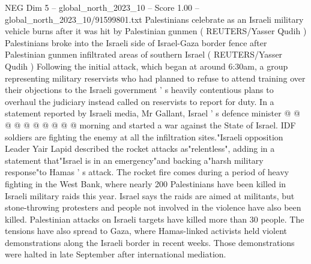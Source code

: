 \begin{textsample}{NEG Dim 5 – global\_north\_2023\_10 – Score 1.00 – global\_north\_2023\_10/91599801.txt}
Palestinians celebrate as an Israeli military vehicle burns after it was hit by Palestinian gunmen ( REUTERS/Yasser Qudih ) Palestinians broke into the Israeli side of Israel-Gaza border fence after Palestinian gunmen infiltrated areas of southern Israel ( REUTERS/Yasser Qudih ) Following the initial attack, which began at around 6:30am, a group representing military reservists who had planned to refuse to attend training over their objections to the Israeli government ' s heavily contentious plans to overhaul the judiciary instead called on reservists to report for duty.
In a statement reported by Israeli media, Mr Gallant, Israel ' s defence minister @ @ @ @ @ @ @ @ @ @ morning and started a war against the State of Israel.
IDF soldiers are fighting the enemy at all the infiltration sites."Israeli opposition Leader Yair Lapid described the rocket attacks as"relentless", adding in a statement that"Israel is in an emergency"and backing a"harsh military response"to Hamas ' s attack.
The rocket fire comes during a period of heavy fighting in the West Bank, where nearly 200 Palestinians have been killed in Israeli military raids this year.
Israel says the raids are aimed at militants, but stone-throwing protesters and people not involved in the violence have also been killed.
Palestinian attacks on Israeli targets have killed more than 30 people.
The tensions have also spread to Gaza, where Hamas-linked activists held violent demonstrations along the Israeli border in recent weeks.
Those demonstrations were halted in late September after international mediation.

\end{textsample}
